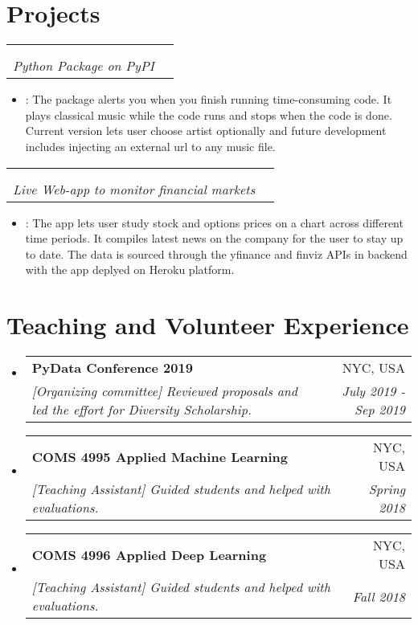 \documentclass[a4paper,20pt]{article}
\makeatletter
\newcommand{\resumeItem}[2]{
  \item\small{
    \textbf{#1}{: #2 \vspace{-2pt}}
  }
}
\newcommand{\resumeSubheading}[4]{
  \vspace{-1pt}\item
    \begin{tabular*}{0.97\textwidth}{l@{\extracolsep{\fill}}r}
      \textbf{#1} & #2 \\
      \textit{#3} & \textit{#4} \\
    \end{tabular*}\vspace{-5pt}
}
\newcommand{\resumeSubHeadingListStart}{\begin{itemize}[leftmargin=*]}
\newcommand{\resumeSubHeadingListEnd}{\end{itemize}}
\newcommand{\resumeItemListStart}{\begin{itemize}}
\newcommand{\resumeItemListEnd}{\end{itemize}\vspace{-5pt}}
\makeatother
\begin{document}
\vspace{0pt}
\section{Projects}
    \resumeSubheading
		{\href{https://pypi.org/project/euphony/}{Euphony}\\}{ }
		{Python Package on PyPI}{ }
		\resumeItemListStart
        \resumeItem
          {}
          {The package alerts you when you finish running time-consuming code. It plays classical music while the code runs and stops when the code is done. Current version lets user choose artist optionally and future development includes injecting an external url to any music file.}
		\resumeItemListEnd

    \resumeSubheading
		{\href{https://stock-app-vk94.herokuapp.com}{Market-Monitor}\\}{ }
		{Live Web-app to monitor financial markets}{ }
		\resumeItemListStart
        \resumeItem{}
          {The app lets user study stock and options prices on a chart across different time periods. It compiles latest news on the company for the user to stay up to date. The data is sourced through the yfinance and finviz APIs in backend with the app deplyed on Heroku platform.}
		\resumeItemListEnd


\vspace{0pt}
\section{Teaching and Volunteer Experience}
  \resumeSubHeadingListStart
	\resumeSubheading
    {PyData Conference 2019}{NYC, USA}
    {[Organizing committee] Reviewed proposals and led the effort for Diversity Scholarship.}{July 2019 - Sep 2019}
\vspace{-5pt}
    \resumeSubheading
    {COMS 4995 Applied Machine Learning}{NYC, USA}
    {[Teaching Assistant] Guided students and helped with evaluations.}{Spring 2018}
\vspace{-5pt}
    \resumeSubheading
    {COMS 4996 Applied Deep Learning}{NYC, USA}
    {[Teaching Assistant] Guided students and helped with evaluations.}{Fall 2018}

\resumeSubHeadingListEnd
\end{document}
